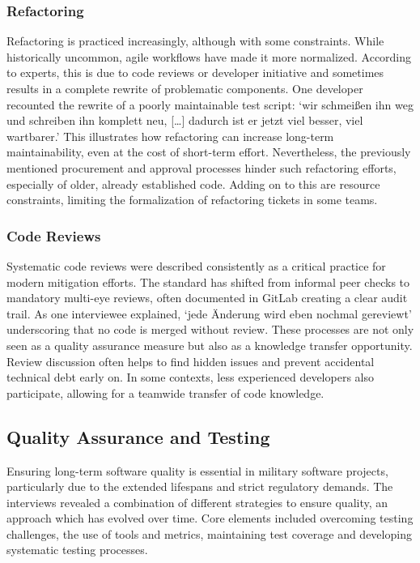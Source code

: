 \subsubsection{Refactoring}
Refactoring is practiced increasingly, although with some constraints. While historically uncommon, agile workflows have made it more normalized. According to experts, this is due to code reviews or developer initiative and sometimes results in a complete rewrite of problematic components.
One developer recounted the rewrite of a poorly maintainable test script: `wir schmeißen ihn weg und schreiben ihn komplett neu, [\ldots] dadurch ist er jetzt viel besser, viel wartbarer.' This illustrates how refactoring can increase long-term maintainability, even at the cost of short-term effort.
Nevertheless, the previously mentioned procurement and approval processes hinder such refactoring efforts, especially of older, already established code. Adding on to this are resource constraints, limiting the formalization of refactoring tickets in some teams.\\

\subsubsection{Code Reviews}
Systematic code reviews were described consistently as a critical practice for modern mitigation efforts. The standard has shifted from informal peer checks to mandatory multi-eye reviews, often documented in GitLab creating a clear audit trail. As one interviewee explained, `jede Änderung wird eben nochmal gereviewt'
underscoring that no code is merged without review. These processes are not only seen as a quality assurance measure but also as a knowledge transfer opportunity. Review discussion often helps to find hidden issues and prevent accidental technical debt early on. In some contexts,
less experienced developers also participate, allowing for a teamwide transfer of code knowledge.\\

\subsection{Quality Assurance and Testing}
Ensuring long-term software quality is essential in military software projects, particularly due to the extended lifespans and strict regulatory demands. The interviews revealed a combination of different strategies to ensure quality, an approach which has evolved over time.
Core elements included overcoming testing challenges, the use of tools and metrics, maintaining test coverage and developing systematic testing processes.

